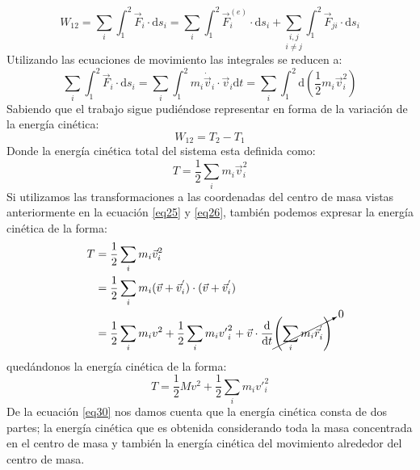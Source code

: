 \documentclass[../main]{subfiles}
\begin{document}
    \begin{equation}
        W_{12}=\sum_i \int_1^2 \vec{F}_i \cdot \text{d} s_i=\sum_i \int_1^2 \vec{F}_i^{(e)}\cdot \text{d}s_i+\underset{i \neq j}{\sum_{i,j}} \int_1^2 \vec{F}_{ji} \cdot \text{d} s_i
        \label{eq28}
    \end{equation}
Utilizando las ecuaciones de movimiento las integrales se reducen a:
    \begin{equation*}
        \sum_i \int_1^2 \vec{F}_i \cdot \text{d} s_i=\sum_i \int_1^2 m_i \dot{\vec{v}}_i \cdot \vec{v}_i \text{d} t= \sum_i \int_1^2 \text{d} \left( \dfrac{1}{2}m_i \vec{v}_i^2 \right)
    \end{equation*}
Sabiendo que el trabajo sigue pudiéndose representar en forma de la variación de la energía cinética:
    \begin{equation*}
        W_{12}=T_2-T_1
    \end{equation*}
Donde la energía cinética total del sistema esta definida como:
    \begin{equation}
        T=\dfrac{1}{2}\sum_i m_i \vec{v}_i^2
        \label{eq29}
    \end{equation}
Si utilizamos las transformaciones a las coordenadas del centro de masa vistas anteriormente en la ecuación \eqref{eq25} y \eqref{eq26}, también podemos expresar la energía cinética de la forma:
    \begin{align*}
        T&=\dfrac{1}{2} \sum_i m_i \vec{v}_i^2 \\
        &=\dfrac{1}{2} \sum_i m_i (\vec{v}+\vec{v}_i^{'})\cdot (\vec{v}+\vec{v}_i^{'}) \\
        &=\dfrac{1}{2} \sum_i m_i v^2+\dfrac{1}{2} \sum_i m_i {v'}_{i}^{2}+\vec{v}\cdot\dfrac{\text{d}}{\text{d}t}  \cancelto{0}{\left( \sum_i m_i \vec{r}_i^{'}\right)} 
    \end{align*}
quedándonos la energía cinética de la forma:
\begin{equation}
    T=\dfrac{1}{2} M v^2+\dfrac{1}{2}\sum_i m_i {v'}_i^2
    \label{eq30}
\end{equation}
De la ecuación \eqref{eq30} nos damos cuenta que la energía cinética consta de dos partes; la energía cinética que es obtenida considerando toda la masa concentrada en el centro de masa y también la energía cinética del movimiento alrededor del centro de masa.
\\
\vspace{0.2cm}
\end{document}
